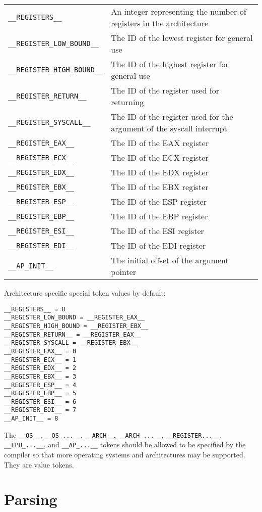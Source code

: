 \documentclass[10pt,a4paper]{article}
\begin{document}
{\footnotesize\begin{tabular}{l p{8cm}}
\verb|__REGISTERS__| & An integer representing the number of registers in the architecture \\
\verb|__REGISTER_LOW_BOUND__| & The ID of the lowest register for general use \\
\verb|__REGISTER_HIGH_BOUND__| & The ID of the highest register for general use \\
\verb|__REGISTER_RETURN__| & The ID of the register used for returning \\
\verb|__REGISTER_SYSCALL__| & The ID of the register used for the argument of the syscall interrupt \\
\verb|__REGISTER_EAX__| & The ID of the EAX register \\
\verb|__REGISTER_ECX__| & The ID of the ECX register \\
\verb|__REGISTER_EDX__| & The ID of the EDX register \\
\verb|__REGISTER_EBX__| & The ID of the EBX register \\
\verb|__REGISTER_ESP__| & The ID of the ESP register \\
\verb|__REGISTER_EBP__| & The ID of the EBP register \\
\verb|__REGISTER_ESI__| & The ID of the ESI register \\
\verb|__REGISTER_EDI__| & The ID of the EDI register \\
\verb|__AP_INIT__| & The initial offset of the argument pointer \\
\end{tabular}}

Architecture specific special token values by default:
\begin{verbatim}
__REGISTERS__ = 8
__REGISTER_LOW_BOUND = __REGISTER_EAX__
__REGISTER_HIGH_BOUND = __REGISTER_EBX__
__REGISTER_RETURN__ = __REGISTER_EAX__
__REGISTER_SYSCALL = __REGISTER_EBX__
__REGISTER_EAX__ = 0
__REGISTER_ECX__ = 1
__REGISTER_EDX__ = 2
__REGISTER_EBX__ = 3
__REGISTER_ESP__ = 4
__REGISTER_EBP__ = 5
__REGISTER_ESI__ = 6
__REGISTER_EDI__ = 7
__AP_INIT__ = 8
\end{verbatim}

The \verb|__OS__|, \verb|__OS_...__|, \verb|__ARCH__|, \verb|__ARCH_...__|, \verb|__REGISTER...__|, \verb|__FPU_...__|, and \verb|__AP_...__| tokens should be allowed to be specified by the compiler so that more operating systems and architectures may be supported. They are value tokens.

\section{Parsing}
\end{document}
